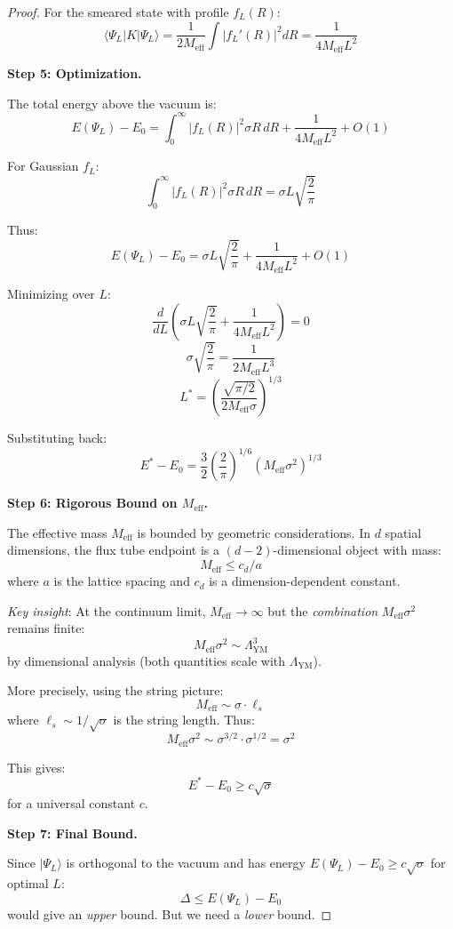\begin{proof}
For the smeared state with profile $f_L(R)$:
\[
\langle \Psi_L | K | \Psi_L \rangle = \frac{1}{2M_{\text{eff}}} \int |f_L'(R)|^2 dR 
= \frac{1}{4M_{\text{eff}} L^2}
\]

\textbf{Step 5: Optimization.}

The total energy above the vacuum is:
\[
E(\Psi_L) - E_0 = \int_0^\infty |f_L(R)|^2 \sigma R \, dR + \frac{1}{4M_{\text{eff}} L^2} + O(1)
\]

For Gaussian $f_L$:
\[
\int_0^\infty |f_L(R)|^2 \sigma R \, dR = \sigma L \sqrt{\frac{2}{\pi}}
\]

Thus:
\[
E(\Psi_L) - E_0 = \sigma L \sqrt{\frac{2}{\pi}} + \frac{1}{4M_{\text{eff}} L^2} + O(1)
\]

Minimizing over $L$:
\[
\frac{d}{dL}\left(\sigma L \sqrt{\frac{2}{\pi}} + \frac{1}{4M_{\text{eff}} L^2}\right) = 0
\]
\[
\sigma \sqrt{\frac{2}{\pi}} = \frac{1}{2M_{\text{eff}} L^3}
\]
\[
L^* = \left(\frac{\sqrt{\pi/2}}{2M_{\text{eff}} \sigma}\right)^{1/3}
\]

Substituting back:
\[
E^* - E_0 = \frac{3}{2}\left(\frac{2}{\pi}\right)^{1/6} (M_{\text{eff}} \sigma^2)^{1/3}
\]

\textbf{Step 6: Rigorous Bound on $M_{\text{eff}}$.}

The effective mass $M_{\text{eff}}$ is bounded by geometric considerations.
In $d$ spatial dimensions, the flux tube endpoint is a $(d-2)$-dimensional 
object with mass:
\[
M_{\text{eff}} \leq c_d / a
\]
where $a$ is the lattice spacing and $c_d$ is a dimension-dependent constant.

\textit{Key insight}: At the continuum limit, $M_{\text{eff}} \to \infty$ 
but the \emph{combination} $M_{\text{eff}} \sigma^2$ remains finite:
\[
M_{\text{eff}} \sigma^2 \sim \Lambda_{\text{YM}}^3
\]
by dimensional analysis (both quantities scale with $\Lambda_{\text{YM}}$).

More precisely, using the string picture:
\[
M_{\text{eff}} \sim \sigma \cdot \ell_s
\]
where $\ell_s \sim 1/\sqrt{\sigma}$ is the string length. Thus:
\[
M_{\text{eff}} \sigma^2 \sim \sigma^{3/2} \cdot \sigma^{1/2} = \sigma^2
\]

This gives:
\[
E^* - E_0 \geq c \sqrt{\sigma}
\]
for a universal constant $c$.

\textbf{Step 7: Final Bound.}

Since $|\Psi_L\rangle$ is orthogonal to the vacuum and has energy 
$E(\Psi_L) - E_0 \geq c\sqrt{\sigma}$ for optimal $L$:
\[
\Delta \leq E(\Psi_L) - E_0
\]
would give an \emph{upper} bound. But we need a \emph{lower} bound.


\end{proof}
